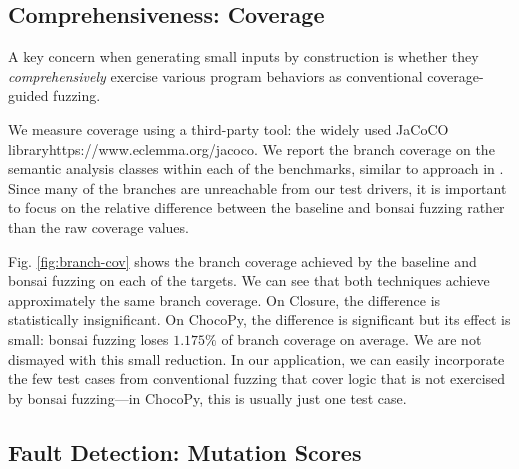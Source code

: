 \documentclass[conference]{IEEEtran}
\newcommand{\tech}{bonsai fuzzing} \newcommand{\Tech}{Bonsai fuzzing} \newcommand{\TECH}{Bonsai Fuzzing}
\begin{document}
\subsection{Comprehensiveness: Coverage}

A key concern when generating small inputs by construction is whether they \emph{comprehensively} exercise various program behaviors as conventional coverage-guided fuzzing.

We measure coverage using a third-party tool: the widely used JaCoCO libraryhttps://www.eclemma.org/jacoco. We report the branch coverage on the semantic analysis classes within each of the benchmarks, similar to approach in \cite{Padhye19-zest}. Since many of the branches are unreachable from our test drivers, it is important to focus on the relative difference between the baseline and \tech{} rather than the raw coverage values.

Fig. \ref{fig:branch-cov} shows the branch coverage achieved by the baseline and \tech{} on each of the targets. We can see that both techniques achieve approximately the same branch coverage. On Closure, the difference is statistically insignificant. On ChocoPy, the difference is significant but its effect is small: \tech{} loses $1.175\%$ of branch coverage on average. We are not dismayed with this small reduction. In our application, we can easily incorporate the few test cases from conventional fuzzing that cover logic that is not exercised by \tech{}---in ChocoPy, this is usually just one test case.



\subsection{Fault Detection: Mutation Scores}
\label{sec:eval-mutation}
\end{document}

